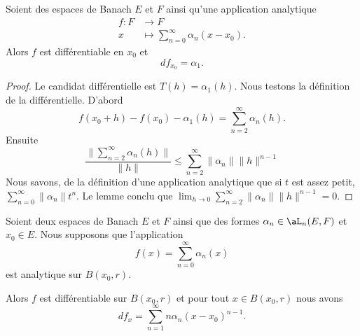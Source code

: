 \begin{lemma}	\label{LEMooVIINooOUwAUQ}
	Soient des espaces de Banach \( E\) et \( F\) ainsi qu'une application analytique
	\begin{equation}
		\begin{aligned}
			f\colon F & \to F                                       \\
			x         & \mapsto \sum_{n=0}^{\infty}\alpha_n(x-x_0).
		\end{aligned}
	\end{equation}
	Alors \( f\) est différentiable en \( x_0\) et
	\begin{equation}
		df_{x_0}=\alpha_1.
	\end{equation}
\end{lemma}

\begin{proof}
	Le candidat différentielle est \( T(h)=\alpha_1(h)\). Nous testons la définition de la différentielle. D'abord
	\begin{equation}
		f(x_0+h)-f(x_0)-\alpha_1(h)=\sum_{n=2}^{\infty}\alpha_n(h).
	\end{equation}
	Ensuite
	\begin{equation}
		\frac{ \| \sum_{n=2}^{\infty}\alpha_n(h) \| }{ \| h \| }\leq\sum_{n=2}^{\infty}\| \alpha_n \|\| h \|^{n-1}
	\end{equation}
	Nous savons, de la définition d'une application analytique que si \( t\) est assez petit, \( \sum_{n=0}^{\infty}\| \alpha_n \|t^{n}\). Le lemme conclu que \( \lim_{h\to 0}\sum_{n=2}^{\infty}\| \alpha_n \|\| h \|^{n-1}=0\).
\end{proof}


\begin{theorem}	\label{THOooCESLooZxAzOg}
	Soient deux espaces de Banach \( E\) et \( F\) ainsi que des formes \( \alpha_n\in\aL_n(E,F)\) et \( x_0\in E\). Nous supposons que l'application
	\begin{equation}
		f(x)=\sum_{n=0}^{\infty}\alpha_n(x)
	\end{equation}
	est analytique sur \( B(x_0,r)\).

	Alors \( f\) est différentiable sur \( B(x_0,r)\) et pour tout \( x\in B(x_0,r)\) nous avons
	\begin{equation}
		df_x=\sum_{n=1}^{\infty}n\alpha_n(x-x_0)^{n-1}.
	\end{equation}
\end{theorem}

